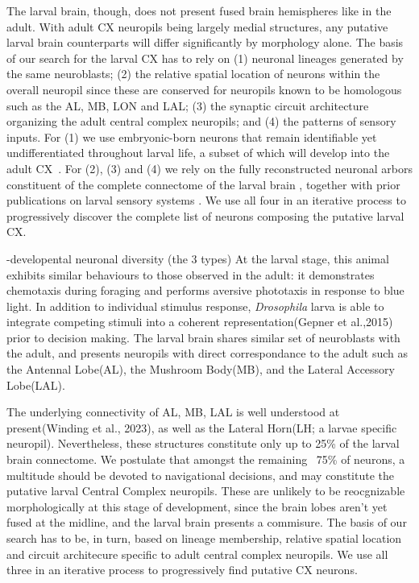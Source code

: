     The larval brain, though, does not present fused brain hemispheres like in the adult.
    With adult CX neuropils being largely medial structures, any putative larval brain counterparts will differ significantly by morphology alone.
    The basis of our search for the larval CX has to rely on (1) neuronal lineages generated by the same neuroblasts; (2) the relative spatial location of neurons within the overall neuropil since these are conserved for neuropils known to be homologous such as the AL, MB, LON and LAL; (3) the synaptic circuit architecture organizing the adult central complex neuropils; and (4) the patterns of sensory inputs.
    For (1) we use embryonic-born neurons that remain identifiable yet undifferentiated throughout larval life, a subset of which will develop into the adult CX~\citep{andrade2019developmentally}.
    For (2), (3) and (4) we rely on the fully reconstructed neuronal arbors constituent of the complete connectome of the larval brain \citep{winding2023connectome}, together with prior publications on larval sensory systems \citep{mast2014pheromones, ohyama2015multilevel, berck2016wiring, schlegel2016synaptic, larderet2017opticlobe, miroschnikow2018convergence, huckesfeld2021unveiling, hernandez2021thermo}.
    We use all four in an iterative process to progressively discover the complete list of neurons composing the putative larval CX.

    -developental neuronal diversity (the 3 types)
    At the larval stage, this animal exhibits  similar behaviours to those observed in the adult: it demonstrates chemotaxis during foraging and performs aversive phototaxis in response to blue light. In addition to individual stimulus response, \textit{Drosophila} larva is able to integrate competing stimuli into a coherent representation(Gepner et al.,2015) prior to decision making. The larval brain shares similar set of neuroblasts with the adult, and presents neuropils with direct correspondance to the adult such as the Antennal Lobe(AL), the Mushroom Body(MB), and the Lateral Accessory Lobe(LAL). 

    The underlying connectivity of AL, MB, LAL is well understood at present(Winding et al., 2023), as well as the Lateral Horn(LH; a larvae specific neuropil). Nevertheless, these structures constitute only up to 25\% of the larval brain connectome. We postulate that amongst the remaining ~75\% of neurons, a multitude should be devoted to navigational decisions, and may constitute the putative larval Central Complex neuropils. These are unlikely to be reocgnizable morphologically at this stage of development, since the brain lobes aren't yet fused at the midline, and the larval brain presents a commisure. The basis of our search has to be, in turn, based on lineage membership, relative spatial location and circuit architecure specific to adult central complex neuropils. We use all three in an iterative process to progressively find putative CX neurons.


